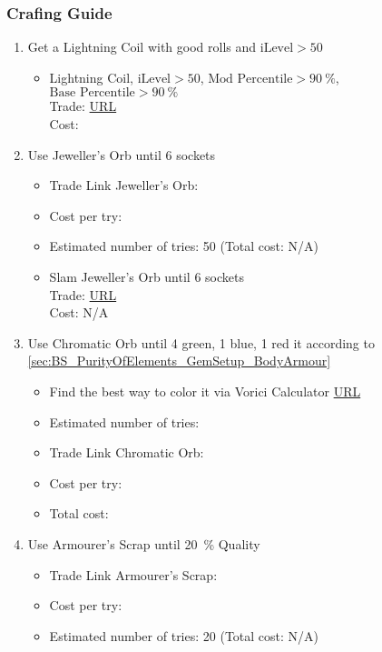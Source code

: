 \subsubsection{Crafing Guide}
\begin{enumerate}
	\item Get a Lightning Coil with good rolls and $\text{iLevel} > 50$
	\begin{itemize}
		\item Lightning Coil, $\text{iLevel} > 50$, $\text{Mod Percentile} > \SI{90}{\percent}$, $\text{Base Percentile} > \SI{90}{\percent}$\\
		Trade: \url{URL}\\
		Cost: 
	\end{itemize}
	\item Use Jeweller's Orb until 6 sockets
	\begin{itemize}
		\item Trade Link Jeweller's Orb:
		\item Cost per try:
		\item Estimated number of tries: 50 \cite{poewiki:1390489} (Total cost: N/A)
	\end{itemize}
	\begin{itemize}
		\item Slam Jeweller's Orb until 6 sockets\\
			Trade: \url{URL}\\
			Cost: N/A
	\end{itemize}
	\item Use Chromatic Orb until 4 green, 1 blue, 1 red it according to \cref{sec:BS_PurityOfElements_GemSetup_BodyArmour}
	\begin{itemize}
		\item Find the best way to color it via Vorici Calculator \url{URL}
		\item Estimated number of tries:
		\item Trade Link Chromatic Orb:
		\item Cost per try:
		\item Total cost:
	\end{itemize}
	\item Use Armourer's Scrap until \SI{20}{\percent} Quality
	\begin{itemize}
		\item Trade Link Armourer's Scrap:
		\item Cost per try:
		\item Estimated number of tries: 20 (Total cost: N/A)
	\end{itemize}

\end{enumerate}
